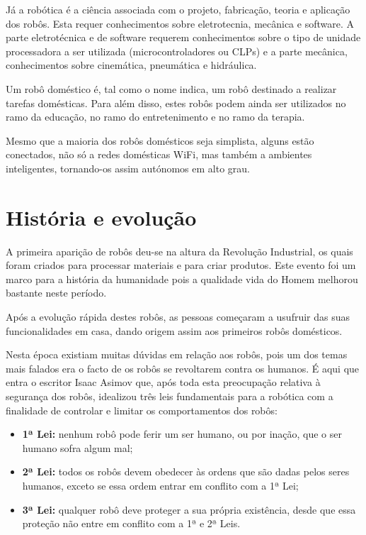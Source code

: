 \documentclass[10pt]{article}
\begin{document}
Já a robótica é a ciência associada com o projeto, fabricação, teoria e aplicação dos robôs. Esta requer conhecimentos sobre eletrotecnia, mecânica e software. A parte eletrotécnica e de software requerem conhecimentos sobre o tipo de unidade processadora a ser utilizada (microcontroladores ou CLPs) e a parte mecânica, conhecimentos sobre cinemática, pneumática e hidráulica.

Um robô doméstico é, tal como o nome indica, um robô destinado a realizar tarefas domésticas. Para além disso, estes robôs podem ainda ser utilizados no ramo da educação, no ramo do entretenimento e no ramo da terapia.\cite{dom-rob}

Mesmo que a maioria dos robôs domésticos seja simplista, alguns estão conectados, não só a redes domésticas WiFi, mas também a ambientes inteligentes, tornando-os assim autónomos em alto grau. 


\section{História e evolução}
\hspace{\parindent}A primeira aparição de robôs deu-se na altura da Revolução Industrial, os quais foram criados para processar materiais e para criar produtos. Este evento foi um marco para a história da humanidade pois a qualidade vida do Homem melhorou bastante neste período.

Após a evolução rápida destes robôs, as pessoas começaram a usufruir das suas funcionalidades em casa, dando origem assim aos primeiros robôs domésticos. 

Nesta época existiam muitas dúvidas em relação aos robôs, pois um dos temas mais falados era o facto de os robôs se revoltarem contra os humanos. É aqui que entra o escritor Isaac Asimov que, após toda esta preocupação relativa à segurança dos robôs, idealizou três leis fundamentais para a robótica com a finalidade de controlar e limitar os comportamentos dos robôs:

\begin{itemize}
    \item \textbf{1ª Lei:} nenhum robô pode ferir um ser humano, ou por inação, que o ser humano sofra algum mal;
    \item \textbf{2ª Lei:} todos os robôs devem obedecer às ordens que são dadas pelos seres humanos, exceto se essa ordem entrar em conflito com a 1ª Lei;
    \item \textbf{3ª Lei:} qualquer robô deve proteger a sua própria existência, desde que essa proteção não entre em conflito com a 1ª e 2ª Leis.
\end{itemize}
\end{document}
